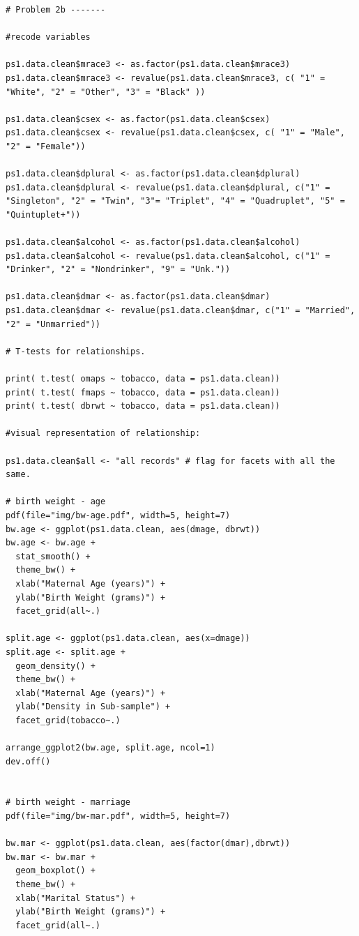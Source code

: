 \documentclass[a4paper, 12pt]{article}
\begin{document}
\begin{verbatim}
# Problem 2b -------

#recode variables

ps1.data.clean$mrace3 <- as.factor(ps1.data.clean$mrace3)
ps1.data.clean$mrace3 <- revalue(ps1.data.clean$mrace3, c( "1" = "White", "2" = "Other", "3" = "Black" ))

ps1.data.clean$csex <- as.factor(ps1.data.clean$csex)
ps1.data.clean$csex <- revalue(ps1.data.clean$csex, c( "1" = "Male", "2" = "Female"))

ps1.data.clean$dplural <- as.factor(ps1.data.clean$dplural)
ps1.data.clean$dplural <- revalue(ps1.data.clean$dplural, c("1" = "Singleton", "2" = "Twin", "3"= "Triplet", "4" = "Quadruplet", "5" = "Quintuplet+"))

ps1.data.clean$alcohol <- as.factor(ps1.data.clean$alcohol)
ps1.data.clean$alcohol <- revalue(ps1.data.clean$alcohol, c("1" = "Drinker", "2" = "Nondrinker", "9" = "Unk."))

ps1.data.clean$dmar <- as.factor(ps1.data.clean$dmar)
ps1.data.clean$dmar <- revalue(ps1.data.clean$dmar, c("1" = "Married", "2" = "Unmarried"))

# T-tests for relationships.

print( t.test( omaps ~ tobacco, data = ps1.data.clean))
print( t.test( fmaps ~ tobacco, data = ps1.data.clean))
print( t.test( dbrwt ~ tobacco, data = ps1.data.clean))

#visual representation of relationship:

ps1.data.clean$all <- "all records" # flag for facets with all the same.

# birth weight - age
pdf(file="img/bw-age.pdf", width=5, height=7)
bw.age <- ggplot(ps1.data.clean, aes(dmage, dbrwt))
bw.age <- bw.age + 
  stat_smooth() +
  theme_bw() + 
  xlab("Maternal Age (years)") + 
  ylab("Birth Weight (grams)") + 
  facet_grid(all~.)

split.age <- ggplot(ps1.data.clean, aes(x=dmage))
split.age <- split.age +
  geom_density() + 
  theme_bw() + 
  xlab("Maternal Age (years)") +
  ylab("Density in Sub-sample") +
  facet_grid(tobacco~.)

arrange_ggplot2(bw.age, split.age, ncol=1)
dev.off()
  

# birth weight - marriage
pdf(file="img/bw-mar.pdf", width=5, height=7)

bw.mar <- ggplot(ps1.data.clean, aes(factor(dmar),dbrwt))
bw.mar <- bw.mar +
  geom_boxplot() +
  theme_bw() +
  xlab("Marital Status") +
  ylab("Birth Weight (grams)") +
  facet_grid(all~.)


\end{verbatim}
\end{document}
